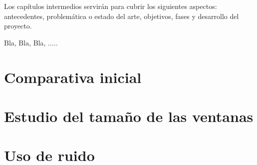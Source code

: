 Los capítulos intermedios servirán para cubrir los siguientes aspectos: antecedentes, problemática o estado del arte, objetivos, fases y desarrollo del proyecto.

\bigskip
Bla, Bla, Bla, .....

\section{Comparativa inicial}
\section{Estudio del tamaño de las ventanas}
\section{Uso de ruido}
